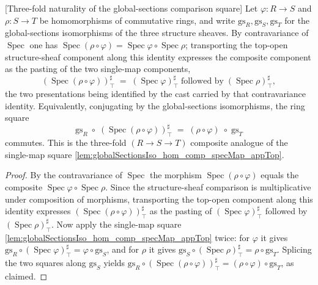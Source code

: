 \begin{lemma}


[Three-fold naturality of the global-sections comparison square]
  \label{lem:globalSectionsIso_hom_comp3_specMap_appTop}
  Let \(\varphi : R \to S\) and \(\rho : S \to T\) be homomorphisms of commutative
  rings, and write \(\mathrm{gs}_R, \mathrm{gs}_S, \mathrm{gs}_T\) for the
  global-sections isomorphisms of the three structure sheaves. By contravariance of
  \(\operatorname{Spec}\) one has
  \(\operatorname{Spec}(\rho\circ\varphi) = \operatorname{Spec}\varphi \circ
  \operatorname{Spec}\rho\); transporting the top-open structure-sheaf component along
  this identity expresses the composite component as the pasting of the two single-map
  components,
  \[
    (\operatorname{Spec}(\rho\circ\varphi))^{\sharp}_{\top}
      \;=\;
    (\operatorname{Spec}\varphi)^{\sharp}_{\top}
      \;\text{followed by}\;
    (\operatorname{Spec}\rho)^{\sharp}_{\top},
  \]
  the two presentations being identified by the cast carried by that contravariance
  identity. Equivalently, conjugating by the global-sections isomorphisms, the ring
  square
  \[
    \mathrm{gs}_R \;\circ\; (\operatorname{Spec}(\rho\circ\varphi))^{\sharp}_{\top}
    \;=\; (\rho\circ\varphi) \;\circ\; \mathrm{gs}_T
  \]
  commutes. This is the three-fold \((R \to S \to T)\) composite analogue of the
  single-map square \cref{lem:globalSectionsIso_hom_comp_specMap_appTop}.
\end{lemma}

\begin{proof}
  By the contravariance of \(\operatorname{Spec}\) the morphism
  \(\operatorname{Spec}(\rho\circ\varphi)\) equals the composite
  \(\operatorname{Spec}\varphi \circ \operatorname{Spec}\rho\). Since the structure-sheaf
  comparison is multiplicative under composition of morphisms, transporting the top-open
  component along this identity expresses
  \((\operatorname{Spec}(\rho\circ\varphi))^{\sharp}_{\top}\) as the pasting of
  \((\operatorname{Spec}\varphi)^{\sharp}_{\top}\) followed by
  \((\operatorname{Spec}\rho)^{\sharp}_{\top}\). Now apply the single-map square
  \cref{lem:globalSectionsIso_hom_comp_specMap_appTop} twice: for \(\varphi\) it gives
  \(\mathrm{gs}_R \circ (\operatorname{Spec}\varphi)^{\sharp}_{\top}
  = \varphi \circ \mathrm{gs}_S\), and for \(\rho\) it gives
  \(\mathrm{gs}_S \circ (\operatorname{Spec}\rho)^{\sharp}_{\top}
  = \rho \circ \mathrm{gs}_T\). Splicing the two squares along \(\mathrm{gs}_S\) yields
  \(\mathrm{gs}_R \circ (\operatorname{Spec}(\rho\circ\varphi))^{\sharp}_{\top}
  = (\rho\circ\varphi) \circ \mathrm{gs}_T\), as claimed.
\end{proof}

